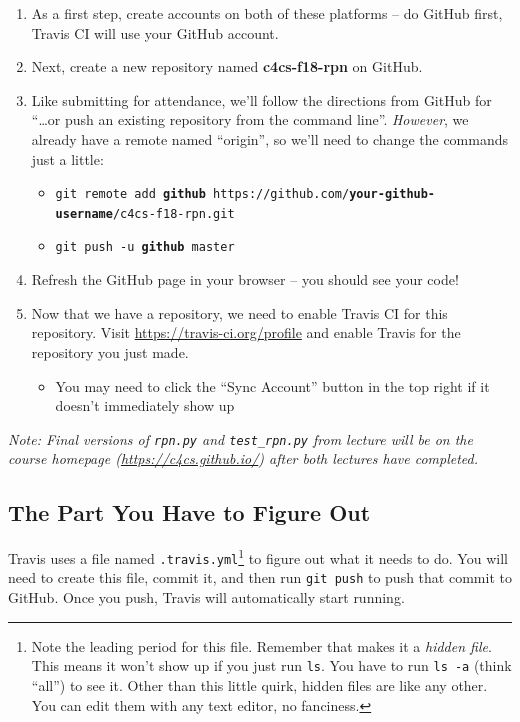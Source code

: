 \documentclass{article}
\begin{document}
\begin{enumerate}
  \item As a first step, create accounts on both of these platforms -- do
    GitHub first, Travis CI will use your GitHub account.
  \item Next, create a new repository named \textbf{c4cs-f18-rpn} on GitHub.
  \item Like submitting for attendance, we'll follow the directions from
    GitHub for ``\dots{}or push an existing repository from the command
    line''. \emph{However}, we already have a remote named ``origin'', so
    we'll need to change the commands just a little:
    \begin{itemize}
      \item \texttt{git remote add \textbf{github} https://github.com/\textbf{your-github-username}/c4cs-f18-rpn.git}
      \item \texttt{git push -u \textbf{github} master}
    \end{itemize}
  \item Refresh the GitHub page in your browser -- you should see your code!
  \item Now that we have a repository, we need to enable Travis CI for this
    repository. Visit \url{https://travis-ci.org/profile} and enable Travis
    for the repository you just made.
    \begin{itemize}
      \item You may need to click the ``Sync Account'' button in the top
        right if it doesn't immediately show up
    \end{itemize}
\end{enumerate}

\emph{Note: Final versions of \texttt{rpn.py} and \texttt{test\_rpn.py} from
  lecture will be on the course homepage (\url{https://c4cs.github.io/}) after both lectures have completed.}

\newpage

\subsection{The Part You Have to Figure Out}

Travis uses a file named \texttt{.travis.yml}\footnote{%
  Note the leading period for this file. Remember that makes it a \emph{hidden
    file}. This means it won't show up if you just run \texttt{ls}. You have
  to run \texttt{ls -a} (think ``all'') to see it. Other than this little
  quirk, hidden files are like any other. You can edit them with any text
  editor, no fanciness.
} to figure out what it needs to do. You will need to create this file, commit
it, and then run \texttt{git push} to push that commit to GitHub. Once you
push, Travis will automatically start running.
\end{document}
